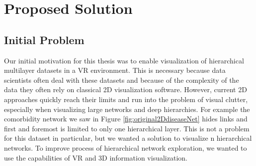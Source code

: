 \chapter{Proposed Solution}
\label{chap:proposed-Solution}
\section{Initial Problem}

Our initial motivation for this thesis was to enable visualization of hierarchical multilayer datasets in a VR environment. 
This is necessary because data scientists often deal with these datasets and because of the complexity of the data they often rely on classical 2D visualization software.
However, current 2D approaches quickly reach their limits and run into the problem of visual clutter, especially when visualizing large networks and deep hierarchies. For example the comorbidity network we saw in Figure \ref{fig:original2DdiseaseNet} hides links and first and foremost is limited to only one hierarchical layer. This is not a problem for this dataset in particular, but we wanted a solution to visualize n hierarchical networks.
To improve process of hierarchical network exploration, we wanted to use the capabilities of VR and 3D information visualization. 

